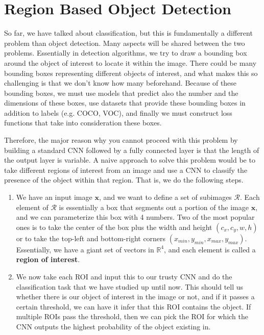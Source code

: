 \section{Region Based Object Detection} 

  So far, we have talked about classification, but this is fundamentally a different problem than object detection. Many aspects will be shared between the two problems. Essentially in detection algorithms, we try to draw a bounding box around the object of interest to locate it within the image. There could be many bounding boxes representing different objects of interest, and what makes this so challenging is that we don't know how many beforehand. Because of these bounding boxes, we must use models that predict also the number and the dimensions of these boxes, use datasets that provide these bounding boxes in addition to labels (e.g. COCO, VOC), and finally we must construct loss functions that take into consideration these boxes. 

  Therefore, the major reason why you cannot proceed with this problem by building a standard CNN followed by a fully connected layer is that the length of the output layer is variable. A naive approach to solve this problem would be to take different regions of interest from an image and use a CNN to classify the presence of the object within that region. That is, we do the following steps. 
  \begin{enumerate}
    \item We have an input image $\mathbf{x}$, and we want to define a set of subimages $\mathcal{R}$. Each element of $\mathcal{R}$ is essentially a box that segments out a portion of the image $\mathbf{x}$, and we can parameterize this box with 4 numbers. Two of the most popular ones is to take the center of the box plus the width and height $(c_x, c_y, w, h)$ or to take the top-left and bottom-right corners $(x_{min}, y_{min}, x_{max}, y_{max})$. Essentially, we have a giant set of vectors in $\mathbb{R}^4$, and each element is called a \textbf{region of interest}. 
    \item We now take each ROI and input this to our trusty CNN and do the classification task that we have studied up until now. This should tell us whether there is our object of interest in the image or not, and if it passes a certain threshold, we can have it infer that this ROI contains the object. If multiple ROIs pass the threshold, then we can pick the ROI for which the CNN outputs the highest probability of the object existing in.  
  \end{enumerate}


